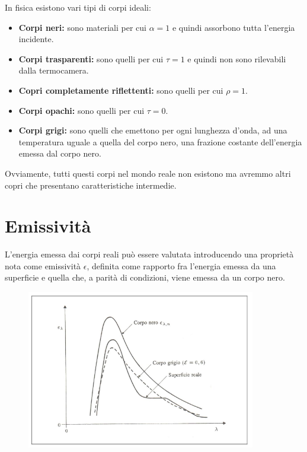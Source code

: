 In fisica esistono vari tipi di corpi ideali:

\begin{itemize}
    \item \textbf{Corpi neri:} sono materiali per cui $\alpha = 1$ e quindi assorbono
          tutta l'energia incidente.
    \item \textbf{Corpi trasparenti:} sono quelli per cui $\tau = 1$ e quindi non sono
          rilevabili dalla termocamera.
    \item \textbf{Copri completamente riflettenti:} sono quelli per cui $\rho = 1$.
    \item \textbf{Corpi opachi:} sono quelli per cui $\tau = 0$.
    \item \textbf{Corpi grigi:} sono quelli che emettono per ogni lunghezza
          d'onda, ad una temperatura uguale a quella del corpo nero,
          una frazione costante dell'energia emessa dal corpo nero.
\end{itemize}

Ovviamente, tutti questi corpi nel mondo reale non esistono ma avremmo altri copri
che presentano caratteristiche intermedie.

\section{Emissività}

L'energia emessa dai corpi reali può essere valutata introducendo
una proprietà nota come emissività $\epsilon$, definita come rapporto fra
l'energia emessa da una superficie e quella che, a parità di
condizioni, viene emessa da un corpo nero.

\begin{figure}[H]
    \centering
    \includegraphics[width=10cm, keepaspectratio]{capitoli/immagini/imgs/corpogrigio.png}
\end{figure}

